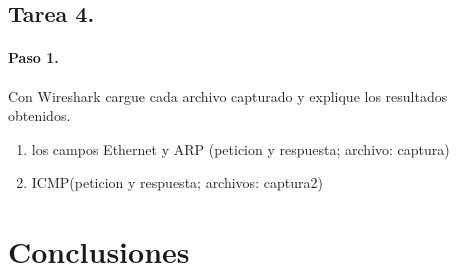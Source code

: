     \subsection{Tarea 4.}
    \paragraph{Paso 1.}
    Con Wireshark cargue cada archivo capturado y explique los resultados obtenidos.
    \begin{enumerate}
        \item los campos Ethernet y ARP (peticion y respuesta; archivo: captura)
        \item ICMP(peticion y respuesta; archivos: captura2)
    \end{enumerate}
    
    \section{Conclusiones}
    
